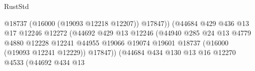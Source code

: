 \begin{lexlean}{RustStd}
\begin{coremodule}
                                                            @18737
                                                            (@16000 (@19093 @12218 @12207))
                                                            @17847))
                                                        (@44684
                                                          @429
                                                          @436
                                                          @13
                                                          @17
                                                          @12246
                                                          @12272
                                                          (@44692
                                                            @429
                                                            @13
                                                            @12246
                                                            (@44940
                                                              @285
                                                              @24
                                                              @13
                                                              @4779
                                                              @4880
                                                              @12228
                                                              @12241
                                                              @44955
                                                              @19066
                                                              @19074
                                                              @19601
                                                              @18737
                                                              (@16000 (@19093 @12241 @12229))
                                                              @17847))
                                                          (@44684
                                                            @434
                                                            @130
                                                            @13
                                                            @16
                                                            @12270
                                                            @4533
                                                            (@44692
                                                              @434
                                                              @13

\end{coremodule}
\end{lexlean}
